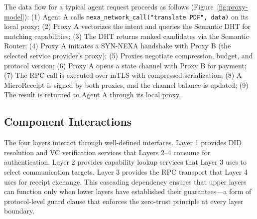 The data flow for a typical agent request proceeds as follows (Figure~\ref{fig:proxy-model}): (1) Agent A calls \texttt{nexa\_network\_call("translate PDF", data)} on its local proxy; (2) Proxy A vectorizes the intent and queries the Semantic DHT for matching capabilities; (3) The DHT returns ranked candidates via the Semantic Router; (4) Proxy A initiates a SYN-NEXA handshake with Proxy B (the selected service provider's proxy); (5) Proxies negotiate compression, budget, and protocol version; (6) Proxy A opens a state channel with Proxy B for payment; (7) The RPC call is executed over mTLS with compressed serialization; (8) A MicroReceipt is signed by both proxies, and the channel balance is updated; (9) The result is returned to Agent A through its local proxy.

\subsection{Component Interactions}

The four layers interact through well-defined interfaces. Layer 1 provides DID resolution and VC verification services that Layers 2--4 consume for authentication. Layer 2 provides capability lookup services that Layer 3 uses to select communication targets. Layer 3 provides the RPC transport that Layer 4 uses for receipt exchange. This cascading dependency ensures that upper layers can function only when lower layers have established their guarantees---a form of protocol-level guard clause that enforces the zero-trust principle at every layer boundary.